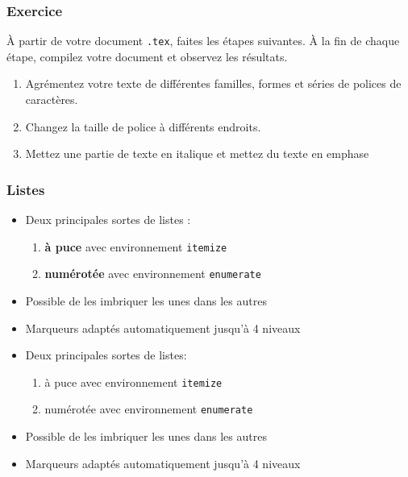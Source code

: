 
\begin{frame}

	\frametitle{Exercice \thenoExercice}
	
	À partir de votre document \texttt{.tex}, faites les étapes suivantes. À la fin de chaque étape,
	compilez votre document et observez les résultats.
	
	\begin{enumerate}
		\item Agrémentez votre texte de différentes familles, formes et séries de polices de caractères.
		\item Changez la taille de police à différents endroits.
		\item Mettez une partie de texte en italique et mettez du texte en emphase
	\end{enumerate}
\end{frame}


\begin{frame}[fragile]

	\frametitle{Listes}
	
	\begin{itemize}
		\item Deux principales sortes de listes :
		\begin{enumerate}
			\item \textbf{à puce} avec environnement \texttt{itemize}
			\item \textbf{numérotée} avec environnement \texttt{enumerate}
		\end{enumerate}
		\item Possible de les imbriquer les unes dans les autres
		\item Marqueurs adaptés automatiquement jusqu'à 4 niveaux
	\end{itemize}

	\pause
	
	\begin{codesource}
	\begin{itemize}
		\item Deux principales sortes de listes:
		\begin{enumerate}
			\item à puce avec environnement \verb=itemize=
			\item numérotée avec environnement \verb=enumerate=
		\end{enumerate}
		\item Possible de les imbriquer les unes
			dans les autres
		\item Marqueurs adaptés automatiquement jusqu'à 4 niveaux
	\end{itemize}
	\end{codesource}

\end{frame}

